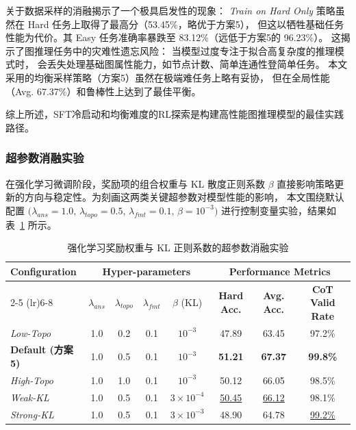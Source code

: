 关于数据采样的消融揭示了一个极具启发性的现象：
\textit{Train on Hard Only} 策略虽然在 Hard 任务上取得了最高分（53.45\%，略优于方案5），
但这以牺牲基础任务性能为代价。其 Easy 任务准确率暴跌至 83.12\%（远低于方案5的 96.23\%）。
这揭示了图推理任务中的灾难性遗忘风险：
当模型过度专注于拟合高复杂度的推理模式时，
会丢失处理基础图属性能力，如节点计数、简单连通性登简单任务。
本文采用的均衡采样策略（方案5）虽然在极端难任务上略有妥协，
但在全局性能（Avg. 67.37\%）和鲁棒性上达到了最佳平衡。

综上所述，SFT冷启动和均衡难度的RL探索是构建高性能图推理模型的最佳实践路径。

\subsubsection{超参数消融实验}
\label{subsec:hyperparam_sensitivity}

在强化学习微调阶段，奖励项的组合权重与 KL 散度正则系数 $\beta$
直接影响策略更新的方向与稳定性。为刻画这两类关键超参数对模型性能的影响，
本文围绕默认配置
$\bigl(\lambda_{ans}=1.0,\,\lambda_{topo}=0.5,\,\lambda_{fmt}=0.1,\,\beta=10^{-3}\bigr)$
进行控制变量实验，结果如表~\ref{tab:param_sensitivity} 所示。

\begin{table}[htbp]
\centering
\caption{强化学习奖励权重与 KL 正则系数的超参数消融实验}
\label{tab:param_sensitivity}
\small
\setlength{\tabcolsep}{6pt}
\renewcommand{\arraystretch}{1.25}
\begin{tabular}{lccccccc}
\toprule
\multirow{2}{*}{\textbf{Configuration}} & \multicolumn{4}{c}{\textbf{Hyper-parameters}} & \multicolumn{3}{c}{\textbf{Performance Metrics}} \\
\cmidrule(lr){2-5} \cmidrule(lr){6-8}
& $\lambda_{ans}$ & $\lambda_{topo}$ & $\lambda_{fmt}$ & $\beta$ (KL) & \textbf{Hard Acc.} & \textbf{Avg. Acc.} & \textbf{CoT Valid Rate} \\
\midrule
\textit{Low-Topo}          & 1.0 & 0.2 & 0.1 & $10^{-3}$         & 47.89 & 63.45 & 97.2\% \\
\textbf{Default (方案5)}    & 1.0 & 0.5 & 0.1 & $10^{-3}$         & \textbf{51.21} & \textbf{67.37} & \textbf{99.8\%} \\
\textit{High-Topo}         & 1.0 & 1.0 & 0.1 & $10^{-3}$         & 50.12 & 66.05 & 98.5\% \\
\midrule
\textit{Weak-KL}           & 1.0 & 0.5 & 0.1 & $3\times 10^{-4}$ & \underline{50.45} &\underline{ 66.12} & 98.1\% \\
\textit{Strong-KL}         & 1.0 & 0.5 & 0.1 & $3\times 10^{-3}$ & 48.90 & 64.78 & \underline{99.2\%} \\
\bottomrule
\end{tabular}
\end{table}

